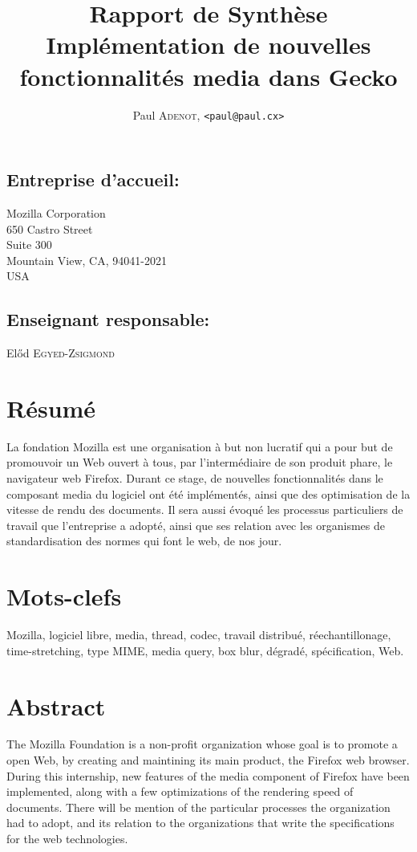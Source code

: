 \documentclass[a4paper,10pt]{article}
\title{\textsf{\textbf{Rapport de Synthèse\\Implémentation de nouvelles
fonctionnalités media dans Gecko}}}
\author{Paul \textsc{Adenot}, \texttt{<paul@paul.cx>}}
\date{}
\begin{document}
\maketitle
\subsection*{Entreprise d'accueil:}
\noindent
Mozilla Corporation\\
650 Castro Street\\
Suite 300\\
Mountain View, CA, 94041-2021\\
USA\\

\subsection*{Enseignant responsable:}
\noindent
Előd \textsc{Egyed-Zsigmond}

\section*{Résumé}
La fondation Mozilla est une organisation à but non lucratif qui a pour but de
promouvoir un Web ouvert à tous, par l'intermédiaire de son produit phare,
le navigateur web Firefox. Durant ce stage, de nouvelles fonctionnalités dans
le composant media du logiciel ont été implémentés, ainsi que des optimisation
de la vitesse de rendu des documents. Il sera aussi évoqué les processus
particuliers de travail que l'entreprise a adopté, ainsi que ses relation avec
les organismes de standardisation des normes qui font le web, de nos jour.

\section*{Mots-clefs}
Mozilla, logiciel libre, media, thread, codec, travail distribué,
réechantillonage, time-stretching, type MIME, media query, box blur, dégradé,
spécification, Web.
\section*{Abstract}
The Mozilla Foundation is a non-profit organization whose goal is to promote a
open Web, by creating and maintining its main product, the Firefox web browser.
During this internship, new features of the media component of Firefox have been
implemented, along with a few optimizations of the rendering speed of documents.
There will be mention of the particular processes the organization had to adopt,
and its relation to the organizations that write the specifications for the web
technologies.
\end{document}
